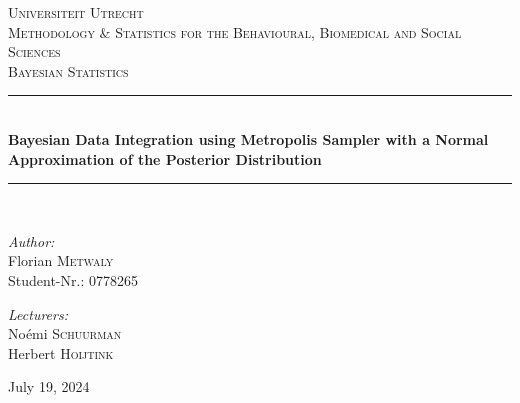 \documentclass[10.5pt]{article}
\newcommand\HRule{\rule{\textwidth}{1pt}}
\begin{document}
\renewcommand{\refname}{Bibliography}

\begin{titlepage}

\begin{center}

\textsc{\LARGE Universiteit Utrecht}\\[2.5cm]

\textsc{\Large Methodology \& Statistics for the Behavioural, Biomedical and Social Sciences}\\[1cm]
\textsc{\large Bayesian Statistics}\\[1cm]
\HRule \\[0.4cm]
{ \LARGE \bfseries Bayesian Data Integration using Metropolis Sampler with a Normal Approximation of the Posterior Distribution}\\[0.4cm]

\HRule \\[4cm]
\begin{minipage}{0.45\textwidth}
\begin{flushleft} \large
\emph{Author:}\\
Florian \textsc{Metwaly} \\
Student-Nr.: 0778265
\end{flushleft}
\end{minipage}
\begin{minipage}{0.45\textwidth}
\begin{flushright} \large
\emph{Lecturers:} \\
Noémi \textsc{Schuurman} \\
Herbert \textsc{Hoijtink} 
\end{flushright}
\end{minipage}

\vfill

{\large July 19, 2024} \\

\end{center}

\end{titlepage}


\tableofcontents
\newpage
\end{document}
